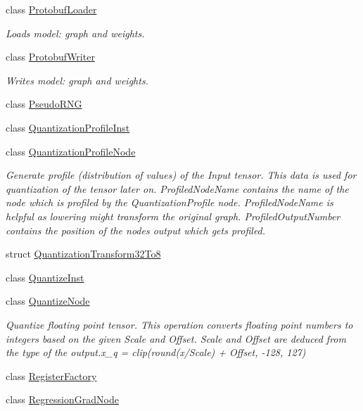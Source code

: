 \begin{DoxyCompactItemize}
class \hyperlink{classglow_1_1_protobuf_loader}{Protobuf\+Loader}
\begin{DoxyCompactList}\small\item\em Loads model\+: graph and weights. \end{DoxyCompactList}\item 
class \hyperlink{classglow_1_1_protobuf_writer}{Protobuf\+Writer}
\begin{DoxyCompactList}\small\item\em Writes model\+: graph and weights. \end{DoxyCompactList}\item 
class \hyperlink{classglow_1_1_pseudo_r_n_g}{Pseudo\+R\+NG}
\item 
class \hyperlink{classglow_1_1_quantization_profile_inst}{Quantization\+Profile\+Inst}
\item 
class \hyperlink{classglow_1_1_quantization_profile_node}{Quantization\+Profile\+Node}
\begin{DoxyCompactList}\small\item\em Generate profile (distribution of values) of the Input tensor. This data is used for quantization of the tensor later on. Profiled\+Node\+Name contains the name of the node which is profiled by the Quantization\+Profile node. Profiled\+Node\+Name is helpful as lowering might transform the original graph. Profiled\+Output\+Number contains the position of the node\textquotesingle{}s output which gets profiled. \end{DoxyCompactList}\item 
struct \hyperlink{structglow_1_1_quantization_transform32_to8}{Quantization\+Transform32\+To8}
\item 
class \hyperlink{classglow_1_1_quantize_inst}{Quantize\+Inst}
\item 
class \hyperlink{classglow_1_1_quantize_node}{Quantize\+Node}
\begin{DoxyCompactList}\small\item\em Quantize floating point tensor. This operation converts floating point numbers to integers based on the given Scale and Offset. Scale and Offset are deduced from the type of the output.\+x\+\_\+q = clip(round(x/\+Scale) + Offset, -\/128, 127) \end{DoxyCompactList}\item 
class \hyperlink{classglow_1_1_register_factory}{Register\+Factory}
\item 
class \hyperlink{classglow_1_1_regression_grad_node}{Regression\+Grad\+Node}
\item 

\end{DoxyCompactItemize}
